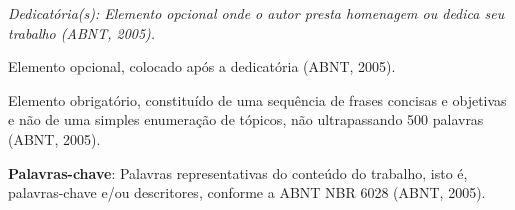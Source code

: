 \cleardoublepage
\thispagestyle{empty}
\vspace*{200mm}

\begin{flushright}
{\em 
Dedicat\'oria(s): Elemento opcional onde o autor presta homenagem ou dedica seu trabalho (ABNT, 2005).
}
\end{flushright}
\newpage


\hspace{5mm}
Elemento opcional, colocado ap\'os a dedicat\'oria (ABNT, 2005). 

\begin{resumo}

Elemento obrigat\'orio, constitu\'ido de uma sequ\^encia de frases concisas e objetivas e n\~ao de uma simples enumera\c c\~ao de t\'opicos, não ultrapassando 500 palavras (ABNT, 2005).

{\hspace{-8mm} \bf{Palavras-chave}}: Palavras representativas do conteúdo do trabalho, isto é, palavras-chave e/ou descritores, conforme a ABNT NBR 6028 (ABNT, 2005).

\end{resumo}

\begin{abstract}

Elemento obrigat\'orio, em língua estrangeira, com as mesmas caracter\'isticas do resumo em l\'ingua vern\'acula (ABNT, 2005).

{\hspace{-8mm} \bf{Keywords}}: Palavras representativas do conte\'udo do trabalho, isto \'e, palavras-chave e/ou descritores, na l\'ingua (ABNT, 2005).

\end{abstract}

\listoffigures


